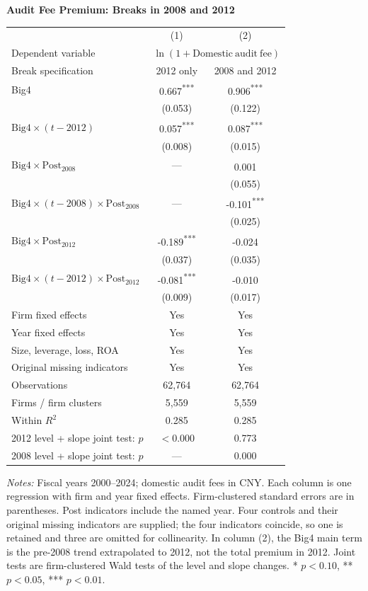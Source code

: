 \documentclass[10pt]{article}
\newcommand{\sym}[1]{\textsuperscript{#1}}
\begin{document}
\fontsize{10}{12}\selectfont\setlength{\parindent}{0pt}
\noindent\textbf{Audit Fee Premium: Breaks in 2008 and 2012}\par\medskip
\setlength{\tabcolsep}{3pt}\renewcommand{\arraystretch}{1.15}
\noindent\begin{tabular*}{\textwidth}{@{\extracolsep{\fill}}lcc@{}}
\toprule
 & (1) & (2) \\
Dependent variable & \multicolumn{2}{c}{\(\ln(1+\mathrm{Domestic\ audit\ fee})\)} \\
Break specification & 2012 only & 2008 and 2012 \\
\midrule
Big4 & 0.667\sym{***} & 0.906\sym{***} \\
 & (0.053) & (0.122) \\
\(\mathrm{Big4}\times(t-2012)\) & 0.057\sym{***} & 0.087\sym{***} \\
 & (0.008) & (0.015) \\
\(\mathrm{Big4}\times\mathrm{Post}_{2008}\) & --- & 0.001\sym{} \\
 &  & (0.055) \\
\(\mathrm{Big4}\times(t-2008)\times\mathrm{Post}_{2008}\) & --- & -0.101\sym{***} \\
 &  & (0.025) \\
\(\mathrm{Big4}\times\mathrm{Post}_{2012}\) & -0.189\sym{***} & -0.024\sym{} \\
 & (0.037) & (0.035) \\
\(\mathrm{Big4}\times(t-2012)\times\mathrm{Post}_{2012}\) & -0.081\sym{***} & -0.010\sym{} \\
 & (0.009) & (0.017) \\
\addlinespace
Firm fixed effects & Yes & Yes \\
Year fixed effects & Yes & Yes \\
Size, leverage, loss, ROA & Yes & Yes \\
Original missing indicators & Yes & Yes \\
Observations & 62,764 & 62,764 \\
Firms / firm clusters & 5,559 & 5,559 \\
Within \(R^2\) & 0.285 & 0.285 \\
\midrule
2012 level + slope joint test: \(p\) & \(<0.000\) & 0.773 \\
2008 level + slope joint test: \(p\) & --- & 0.000 \\
\bottomrule
\end{tabular*}
\par\medskip\fontsize{9}{11}\selectfont\textit{Notes:} Fiscal years 2000--2024; domestic audit fees in CNY. Each column is one regression with firm and year fixed effects. Firm-clustered standard errors are in parentheses. Post indicators include the named year. Four controls and their original missing indicators are supplied; the four indicators coincide, so one is retained and three are omitted for collinearity. In column (2), the Big4 main term is the pre-2008 trend extrapolated to 2012, not the total premium in 2012. Joint tests are firm-clustered Wald tests of the level and slope changes. * \(p<0.10\), ** \(p<0.05\), *** \(p<0.01\).
\end{document}

